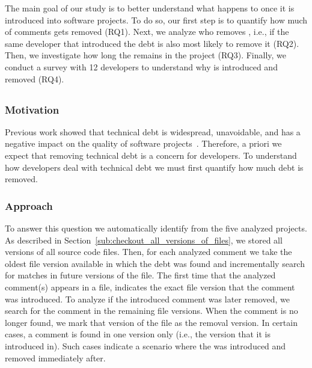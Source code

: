 
The main goal of our study is to better understand what happens to \SATD once it is introduced into software projects. To do so, our first step is to quantify how much of \SATD comments gets removed (RQ1). Next, we analyze who removes \SATD, i.e., if the same developer that introduced the debt is also most likely to remove it (RQ2). Then, we investigate how long the \SATD remains in the project (RQ3). Finally, we conduct a survey with 12 developers to understand why \SATD is introduced and removed (RQ4). 



\subsection*{\rqi}
\subsubsection*{Motivation} Previous work showed that technical debt is widespread, unavoidable, and has a negative impact on the quality of software projects~\cite{Lim2012Software}. Therefore, a priori we expect that removing technical debt is a concern for developers. To understand how developers deal with technical debt we must first quantify how much debt is removed. 


\subsubsection*{Approach} To answer this question we automatically identify \SATD from the five analyzed projects. As described in Section~\ref{sub:checkout_all_versions_of_files}, we stored all versions of all source code files. Then, for each analyzed \SATD comment we take the oldest file version available in which the debt was found and incrementally search for matches in future versions of the file. The first time that the analyzed \SATD comment(s) appears in a file, indicates the exact file version that the \SATD comment was introduced. To analyze if the introduced \SATD comment was later removed, we search for the comment in the remaining file versions. When the comment is no longer found, we mark that version of the file as the removal version. In certain cases, a \SATD comment is found in one version only (i.e., the version that it is introduced in). Such cases indicate a scenario where the \SATD was introduced and removed immediately after. 

